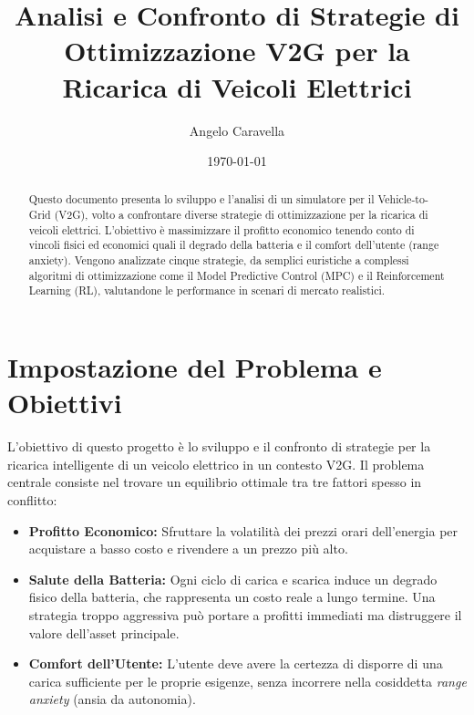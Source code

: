 \documentclass[11pt, a4paper]{article}
\title{Analisi e Confronto di Strategie di Ottimizzazione V2G per la Ricarica di Veicoli Elettrici}
\author{Angelo Caravella}
\date{\today}
\begin{document}
\maketitle

\begin{abstract}
Questo documento presenta lo sviluppo e l'analisi di un simulatore per il Vehicle-to-Grid (V2G), volto a confrontare diverse strategie di ottimizzazione per la ricarica di veicoli elettrici. L'obiettivo è massimizzare il profitto economico tenendo conto di vincoli fisici ed economici quali il degrado della batteria e il comfort dell'utente (range anxiety). Vengono analizzate cinque strategie, da semplici euristiche a complessi algoritmi di ottimizzazione come il Model Predictive Control (MPC) e il Reinforcement Learning (RL), valutandone le performance in scenari di mercato realistici.
\end{abstract}

\tableofcontents
\newpage

\section{Impostazione del Problema e Obiettivi}

L'obiettivo di questo progetto è lo sviluppo e il confronto di strategie per la ricarica intelligente di un veicolo elettrico in un contesto V2G. Il problema centrale consiste nel trovare un equilibrio ottimale tra tre fattori spesso in conflitto:

\begin{itemize}
    \item \textbf{Profitto Economico:} Sfruttare la volatilità dei prezzi orari dell'energia per acquistare a basso costo e rivendere a un prezzo più alto.
    \item \textbf{Salute della Batteria:} Ogni ciclo di carica e scarica induce un degrado fisico della batteria, che rappresenta un costo reale a lungo termine. Una strategia troppo aggressiva può portare a profitti immediati ma distruggere il valore dell'asset principale.
    \item \textbf{Comfort dell'Utente:} L'utente deve avere la certezza di disporre di una carica sufficiente per le proprie esigenze, senza incorrere nella cosiddetta \textit{range anxiety} (ansia da autonomia).
\end{itemize}
\end{document}
